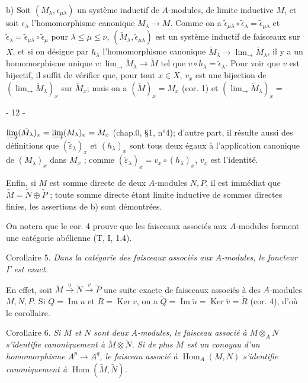 b) Soit $(M_{\lambda}, \epsilon_{\mu\lambda})$ un système inductif de $A$-modules, de limite inductive $M$, et soit $\epsilon_{\lambda}$ l'homomorphisme canonique $M_{\lambda} \to M$. Comme on a $\tilde{\epsilon}_{\mu\lambda} \circ \tilde{\epsilon}_{\lambda} = \tilde{\epsilon}_{\mu\lambda}$ et $\tilde{\epsilon}_{\lambda} = \tilde{\epsilon}_{\mu\lambda} \circ \tilde{\epsilon}_{\mu}$ pour $\lambda \le \mu \le \nu$, $(\tilde{M}_{\lambda}, \tilde{\epsilon}_{\mu\lambda})$ est un système inductif de faisceaux sur $X$, et si on désigne par $h_{\lambda}$ l'homomorphisme canonique $\tilde{M}_{\lambda} \to \lim_{\to} \tilde{M}_{\lambda}$, il y a un homomorphisme unique $v: \lim_{\to} \tilde{M}_{\lambda} \to \tilde{M}$ tel que $v \circ h_{\lambda} = \tilde{\epsilon}_{\lambda}$. Pour voir que $v$ est bijectif, il suffit de vérifier que, pour tout $x \in X$, $v_x$ est une bijection de $(\lim_{\to} \tilde{M}_{\lambda})_x$ sur $\tilde{M}_x$; mais on a $(\tilde{M})_x = M_x$ (cor. 1) et $(\lim_{\to} \tilde{M}_{\lambda})_x = $

\newpage


- 12 -

$\varinjlim (\tilde{M}_\lambda)_x = \varinjlim (M_\lambda)_x = M_x$ (chap.0, §1, n°4); d'autre part, il résulte aussi des définitions que $(\tilde{\varepsilon}_\lambda)_x$ et $(h_\lambda)_x$ sont tous deux égaux à l'application canonique de $(M_\lambda)_x$ dans $M_x$ ; comme $(\tilde{\varepsilon}_\lambda)_x = v_x \circ (h_\lambda)_x$, $v_x$ est l'identité.

Enfin, si $M$ est somme directe de deux $A$-modules $N, P$, il est immédiat que $\tilde{M} = \tilde{N} \oplus \tilde{P}$ ; toute somme directe étant limite inductive de sommes directes finies, les assertions de b) sont démontrées.

On notera que le cor. 4 prouve que les faisceaux associés aux $A$-modules forment une catégorie abélienne (T, I, 1.4).

Corollaire 5. \emph{Dans la catégorie des faisceaux associés aux $A$-modules, le foncteur $\Gamma$ est exact.}

En effet, soit $\tilde{M} \xrightarrow{u} \tilde{N} \xrightarrow{v} \tilde{P}$ une suite exacte de faisceaux associés à des $A$-modules $M, N, P$. Si $Q = \operatorname{Im} u$ et $R = \operatorname{Ker} v$, on a $\tilde{Q} = \operatorname{Im} \tilde{u} = \operatorname{Ker} \tilde{v} = \tilde{R}$ (cor. 4), d'où le corollaire.

Corollaire 6. \emph{Si $M$ et $N$ sont deux $A$-modules, le faisceau associé à $M \otimes_A N$ s'identifie canoniquement à $\tilde{M} \otimes \tilde{N}$. Si de plus $M$ est un conoyau d'un homomorphisme $A^p \to A^q$, le faisceau associé à $\operatorname{Hom}_A(M, N)$ s'identifie canoniquement à $\operatorname{Hom}(\tilde{M}, \tilde{N})$.}

